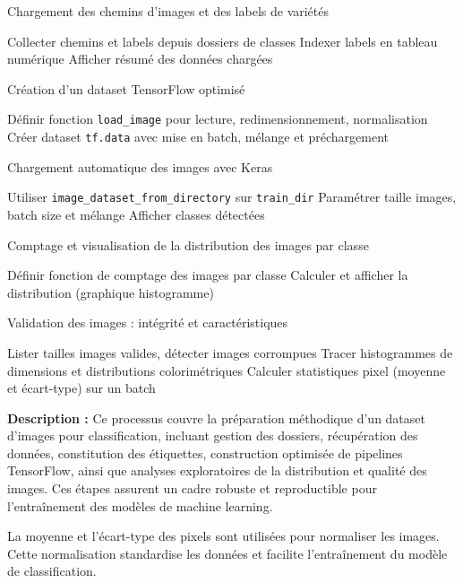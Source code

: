\begin{algorithm}[H]
\caption{Chargement des chemins d'images et des labels de variétés}
Collecter chemins et labels depuis dossiers de classes\;
Indexer labels en tableau numérique\;
Afficher résumé des données chargées\;
\end{algorithm}

\begin{algorithm}[H]
\caption{Création d'un dataset TensorFlow optimisé}
Définir fonction \texttt{load\_image} pour lecture, redimensionnement, normalisation\;
Créer dataset \texttt{tf.data} avec mise en batch, mélange et préchargement\;
\end{algorithm}

\begin{algorithm}[H]
\caption{Chargement automatique des images avec Keras}
Utiliser \texttt{image\_dataset\_from\_directory} sur \texttt{train\_dir}\;
Paramétrer taille images, batch size et mélange\;
Afficher classes détectées\;
\end{algorithm}

\begin{algorithm}[H]
\caption{Comptage et visualisation de la distribution des images par classe}
Définir fonction de comptage des images par classe\;
Calculer et afficher la distribution (graphique histogramme)\;
\end{algorithm}

\begin{algorithm}[H]
\caption{Validation des images : intégrité et caractéristiques}
Lister tailles images valides, détecter images corrompues\;
Tracer histogrammes de dimensions et distributions colorimétriques\;
Calculer statistiques pixel (moyenne et écart-type) sur un batch\;
\end{algorithm}

\vspace{5mm}

\noindent\textbf{Description :} Ce processus couvre la préparation méthodique d'un dataset d'images pour classification, incluant gestion des dossiers, récupération des données, constitution des étiquettes, construction optimisée de pipelines TensorFlow, ainsi que analyses exploratoires de la distribution et qualité des images. Ces étapes assurent un cadre robuste et reproductible pour l'entraînement des modèles de machine learning.


La moyenne et l’écart-type des pixels sont utilisées pour normaliser les images. Cette normalisation standardise les données et facilite l’entraînement du modèle de classification.

